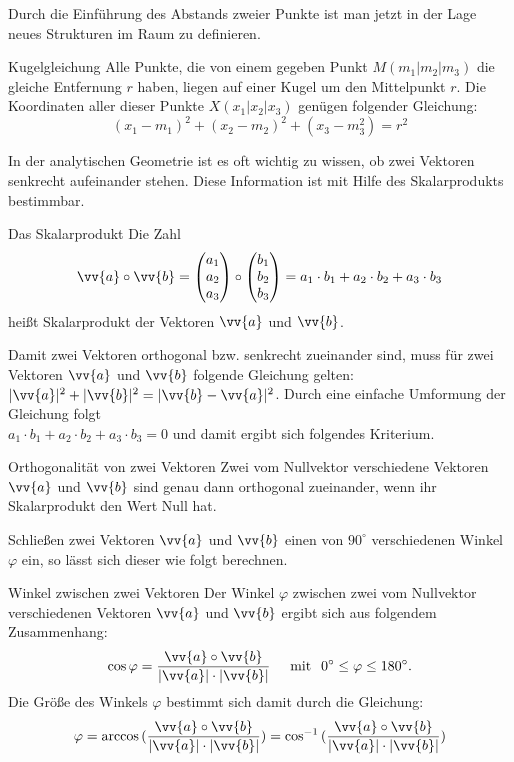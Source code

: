 Durch die Einführung des Abstands zweier Punkte ist man jetzt in der Lage neues Strukturen im Raum zu definieren. 
\begin{b8d}{Kugelgleichung}{}
Alle Punkte, die von einem gegeben Punkt $M(m_1|m_2|m_3)$ die gleiche Entfernung $r$ haben, liegen auf einer Kugel um den Mittelpunkt $r$. Die Koordinaten aller dieser Punkte $X(x_1|x_2|x_3)$ genügen folgender Gleichung: $$(x_1-m_1)^2 + (x_2 -m_2)^2 + (x_3 -m_3 ^2) = r^2$$
\end{b8d}
In der analytischen Geometrie ist es oft wichtig zu wissen, ob zwei Vektoren senkrecht aufeinander stehen. Diese Information ist mit Hilfe des Skalarprodukts bestimmbar.
\begin{merke}{Das Skalarprodukt}{}
Die Zahl $$\vv{a} \circ \vv{b} = \begin{pmatrix} a_1 \\a_2 \\a_3\end{pmatrix} \circ \begin{pmatrix} b_1 \\b_2 \\b_3\end{pmatrix} = a_1\cdot b_1 + a_2\cdot b_2 + a_3\cdot b_3$$ heißt Skalarprodukt der Vektoren $\vv{a}$ und $\vv{b}$. 
\end{merke}
Damit zwei Vektoren orthogonal bzw. senkrecht zueinander sind, muss für zwei Vektoren $\vv{a}$ und $\vv{b}$ folgende Gleichung gelten: $|\vv{a}|^2 + |\vv{b}|^2 = |\vv{b} -\vv{a}|^2$. Durch eine einfache Umformung der Gleichung folgt\\ $ a_1\cdot b_1 + a_2\cdot b_2 + a_3\cdot b_3 = 0$ und damit ergibt sich folgendes Kriterium.
\begin{b8d}{Orthogonalität von zwei Vektoren}{} 
Zwei vom Nullvektor verschiedene Vektoren $\vv{a}$ und $\vv{b}$ sind genau dann orthogonal zueinander, wenn ihr Skalarprodukt den Wert Null hat.
\end{b8d}
Schließen zwei Vektoren $\vv{a}$ und $\vv{b}$ einen von $90^{\circ}$ verschiedenen Winkel $\varphi$ ein, so lässt sich dieser wie folgt berechnen.
\begin{merke}{Winkel zwischen zwei Vektoren}{}
Der Winkel $\varphi$ zwischen zwei vom Nullvektor verschiedenen Vektoren $\vv{a}$ und $\vv{b}$ ergibt sich aus folgendem Zusammenhang: $$\cos{\varphi} = \dfrac{\vv{a} \circ \vv{b}}{|\vv{a}| \cdot |\vv{b}|}\hspace{0.5cm}\text{mit}\hspace{0.25cm} 0^{\circ} \leq \varphi \leq 180^{\circ}.$$ 
Die Größe des Winkels $\varphi$ bestimmt sich damit durch die Gleichung:
$$\varphi = \arccos{(\dfrac{\vv{a} \circ \vv{b}}{|\vv{a}| \cdot |\vv{b}|})} = \cos^{-1}{(\dfrac{\vv{a} \circ \vv{b}}{|\vv{a}| \cdot |\vv{b}|})}$$
\end{merke}
